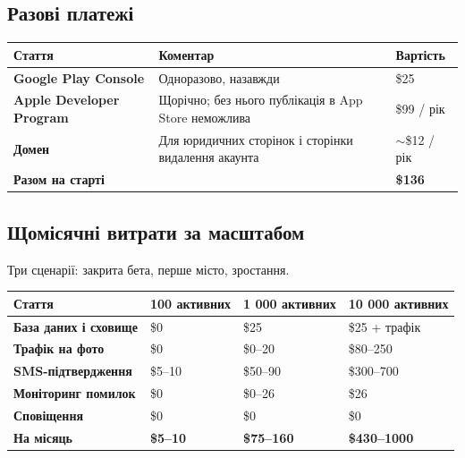 \documentclass[11pt,a4paper]{article}
\newcommand{\thead}[1]{{\color{muted}\footnotesize\bfseries #1}}
\begin{document}
\subsection{Разові платежі}

\begin{xltabular}{\textwidth}{N{5cm} Y R{2.6cm}}
\toprule
\thead{Стаття} & \thead{Коментар} & \thead{Вартість} \\
\midrule
\textbf{Google Play Console}     & Одноразово, назавжди & \$25 \\
\textbf{Apple Developer Program} & Щорічно; без нього публікація в App Store неможлива & \$99 / рік \\
\textbf{Домен}                   & Для юридичних сторінок і сторінки видалення акаунта & $\sim$\$12 / рік \\
\midrule
{\color{ink}\bfseries Разом на старті} & & {\color{ink}\bfseries \$136} \\
\bottomrule
\end{xltabular}

\subsection{Щомісячні витрати за масштабом}

Три сценарії: закрита бета, перше місто, зростання.

\begin{xltabular}{\textwidth}{Y R{2.5cm} R{2.5cm} R{2.7cm}}
\toprule
\thead{Стаття} & \thead{100 активних} & \thead{1 000 активних} & \thead{10 000 активних} \\
\midrule
\textbf{База даних і сховище} 
  & \$0 & \$25 & \$25 + трафік \\
\textbf{Трафік на фото} 
  & \$0 & \$0--20 & \$80--250 \\
\textbf{SMS-підтвердження} 
  & \$5--10 & \$50--90 & \$300--700 \\
\textbf{Моніторинг помилок} 
  & \$0 & \$0--26 & \$26 \\
\textbf{Сповіщення} 
  & \$0 & \$0 & \$0 \\
\midrule
{\color{ink}\bfseries На місяць}
  & {\color{ink}\bfseries \$5--10} & {\color{ink}\bfseries \$75--160} & {\color{ink}\bfseries \$430--1000} \\
\bottomrule
\end{xltabular}
\end{document}
